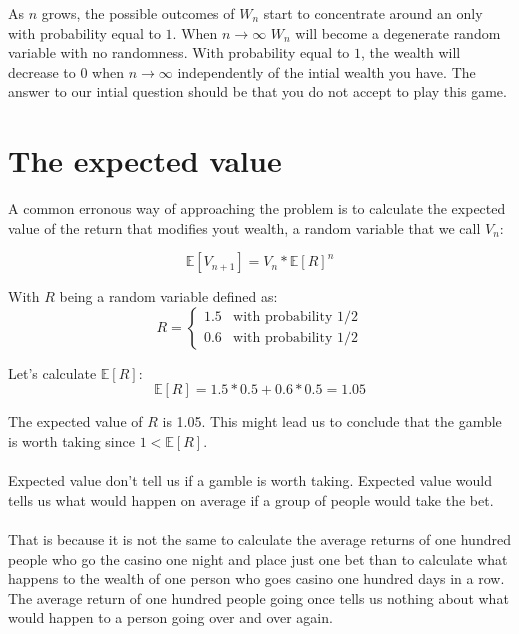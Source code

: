 \documentclass[12pt]{article}
\begin{document}
As $n$ grows, the possible outcomes of $W_n$ start to concentrate around an only with probability equal to $1$. When $n \rightarrow \infty$ $W_n$ will become a degenerate random variable with no randomness. With probability equal to $1$, the wealth will decrease to 0 when $n\to\infty$ independently of the intial wealth you have. The answer to our intial question should be that you do not accept to play this game.

\section{The expected value}
A common erronous way of approaching the problem is to calculate the expected value of the return that modifies yout wealth, a random variable that we call $V_n$:

\begin{equation*}
  \mathbb{E}[V_{n+1}] = V_{n} * \mathbb{E}[R]^n
\end{equation*}

With $R$ being a random variable defined as:
\begin{equation*}
R = \left\{
	\begin{array}{ll}
		1.5 & \mbox{with probability 1/2} \\
		0.6 & \mbox{with probability 1/2}
	\end{array}
\right.
\end{equation*}

Let's calculate $\mathbb{E}[R]$:
\begin{equation*}
  \mathbb{E}[R] = 1.5 * 0.5 + 0.6 * 0.5 = 1.05
\end{equation*}

The expected value of $R$ is 1.05. This might lead us to conclude that the gamble is worth taking since $1 < \mathbb{E}[R]$.
\\\\
Expected value don't tell us if a gamble is worth taking. Expected value would tells us what would happen on average if a group of people would take the bet.
\\\\
That is because it is not the same to calculate the average returns of one hundred people who go the casino one night and place just one bet than to calculate what happens to the wealth of one person who goes casino one hundred days in a row. The average return of one hundred people going once tells us nothing about what would happen to a person going over and over again. 
\end{document}
